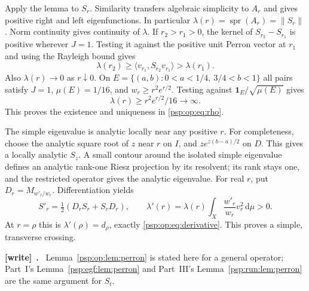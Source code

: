 \documentclass[11pt,letterpaper]{article}
\numberwithin{equation}{section}
\theoremstyle{remark}\newtheorem{remark}[theorem]{Remark}
\newcommand{\dd}{\,\mathrm d}
\newcommand{\one}{\mathbf1}
\newcommand{\spr}{\operatorname{spr}}
\newenvironment{writenote}[1][]{\par\smallskip\begingroup\small
 \noindent\textbf{[write]}\if\relax\detokenize{#1}\relax\else~\textbf{#1.}\fi\ }%
 {\par\endgroup\smallskip}
\begin{document}
Apply the lemma to $S_r$. Similarity transfers algebraic simplicity
to $A_r$ and gives positive right and left eigenfunctions. In
particular $\lambda(r)=\spr(A_r)=\|S_r\|$.
Norm continuity gives continuity of $\lambda$. If $r_2>r_1>0$,
the kernel of $S_{r_2}-S_{r_1}$ is positive wherever $J=1$.
Testing it against the positive unit Perron vector at $r_1$ and
using the Rayleigh bound gives
\[
 \lambda(r_2)\geq\langle v_{r_1},S_{r_2}v_{r_1}\rangle
  >\lambda(r_1).
\]
Also $\lambda(r)\to0$ as $r\downarrow0$.
On $E=\{(a,b):0<a<1/4,\ 3/4<b<1\}$ all pairs satisfy $J=1$,
$\mu(E)=1/16$, and $w_r\geq r^2e^{r/2}$. Testing against
$\one_E/\sqrt{\mu(E)}$ gives
\begin{equation}\label{psp:op:eq:large-r}
 \lambda(r)\geq r^2e^{r/2}/16\longrightarrow\infty.
\end{equation}
This proves the existence and uniqueness in \eqref{psp:op:eq:rho}.

The simple eigenvalue is analytic locally near any positive $r$.
For completeness, choose the analytic square root of $z$ near $r$
on $I$, and $ze^{z(b-a)/2}$ on $D$. This gives a locally analytic
$S_z$. A small contour around the isolated simple eigenvalue defines
an analytic rank-one Riesz projection by its resolvent; its rank
stays one, and the restricted operator gives the analytic eigenvalue.
For real $r$, put $D_r=M_{w'_r/w_r}$. Differentiation yields
\[
 S'_r=\tfrac12(D_rS_r+S_rD_r),\qquad
 \lambda'(r)=\lambda(r)\int_X\frac{w'_r}{w_r}v_r^2\dd\mu>0.
\]
At $r=\rho$ this is $\lambda'(\rho)=d_\rho$, exactly
\eqref{psp:op:eq:derivative}. This proves a simple, transverse crossing.
\begin{writenote}
Lemma~\ref{psp:op:lem:perron} is stated here for a general operator; Part~I's Lemma~\ref{psp:egf:lem:perron} and Part~III's Lemma~\ref{psp:run:lem:perron} are the same argument for $S_t$.
\end{writenote}
\end{document}
